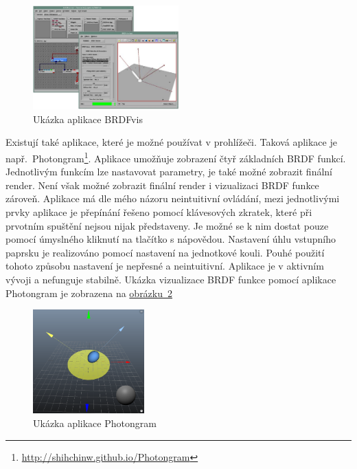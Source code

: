 \documentclass[czech,master]{diploma}
\begin{document}
\begin{figure}[ht]
  \centering
  \includegraphics[height=4cm]{Figures/brdfvisWalker.png}
  \caption{Ukázka aplikace BRDFvis~\cite{brdfviz}}%
  \label{fig:walkerBrdfApp}%
\end{figure}

Existují také aplikace, které je možné používat v prohlížeči. Taková aplikace je např.\ Photongram\footnote{\url{http://shihchinw.github.io/Photongram}}. Aplikace umožňuje zobrazení čtyř základních BRDF funkcí. Jednotlivým funkcím lze nastavovat parametry, je také možné zobrazit finální render. Není však možné zobrazit finální render i vizualizaci BRDF funkce zároveň. Aplikace má dle mého názoru neintuitivní ovládání, mezi jednotlivými prvky aplikace je přepínání řešeno pomocí klávesových zkratek, které při prvotním spuštění nejsou nijak představeny. Je možné se k nim dostat pouze pomocí úmyslného kliknutí na tlačítko s nápovědou. Nastavení úhlu vstupního paprsku je realizováno pomocí nastavení na jednotkové kouli. Pouhé použití tohoto způsobu nastavení je nepřesné a neintuitivní. Aplikace je v aktivním vývoji a nefunguje stabilně. Ukázka vizualizace BRDF funkce pomocí aplikace Photongram je zobrazena na \hyperref[fig:photongramApp]{obrázku~\ref{fig:photongramApp}}\par

\begin{figure}[ht]
  \centering
  \includegraphics[height=4cm]{Figures/photongram.png}
  \caption{Ukázka aplikace Photongram}%
  \label{fig:photongramApp}%
\end{figure}
\end{document}
